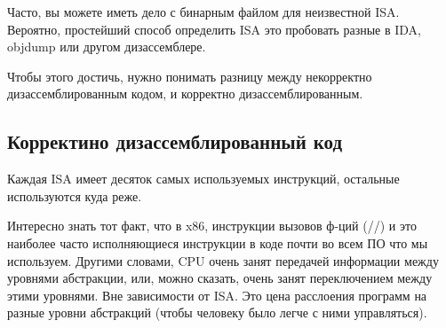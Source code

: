 \label{ISA_detect}

Часто, вы можете иметь дело с бинарным файлом для неизвестной \ac{ISA}.
Вероятно, простейший способ определить \ac{ISA} это пробовать разные в IDA, objdump или другом дизассемблере.

Чтобы этого достичь, нужно понимать разницу между некорректно дизассемблированным кодом, и корректно дизассемблированным.

\renewcommand{\CURPATH}{digging_into_code/incorrect_disassembly}


\subsection{Корректино дизассемблированный код}
\label{correctly_disasmed_code}

Каждая \ac{ISA} имеет десяток самых используемых инструкций, остальные используются куда реже.

Интересно знать тот факт, что в x86, инструкции вызовов ф-ций (\PUSH/\CALL/\ADD) и \MOV
это наиболее часто исполняющиеся инструкции в коде почти во всем ПО что мы используем.
Другими словами, \ac{CPU} очень занят передачей информации между уровнями абстракции, или, можно сказать, очень занят
переключением между этими уровнями.
Вне зависимости от \ac{ISA}.
Это цена расслоения программ на разные уровни абстракций (чтобы человеку было легче с ними управляться).

